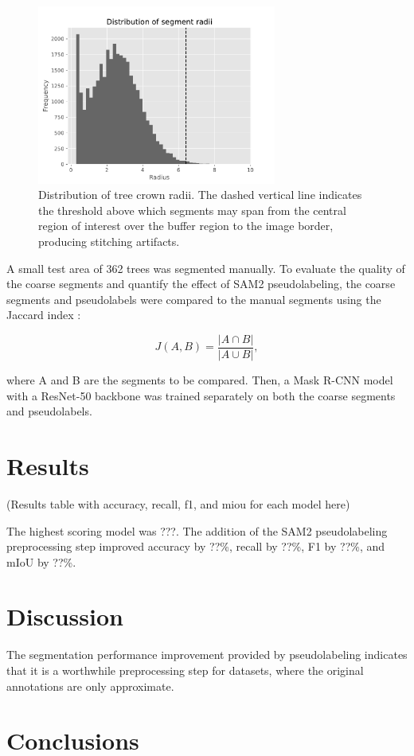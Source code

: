 \documentclass[english, 12pt, a4paper, sci, utf8, a-2b, online]{aaltothesis}
\begin{document}
\begin{figure}[h]
    \centering
    \includegraphics[width=0.7\textwidth]{figures/radii.pdf}
    \caption{Distribution of tree crown radii. The dashed vertical line indicates the threshold above which segments may span from the central region of interest over the buffer region to the image border, producing stitching artifacts.}
    \label{fig:radii}
\end{figure}

A small test area of 362 trees was segmented manually. To evaluate the quality of the coarse segments and quantify the effect of SAM2 pseudolabeling, the coarse segments and pseudolabels were compared to the manual segments using the Jaccard index \cite{jaccard}:

$$
J(A, B) = \frac{|A \cap B|}{|A \cup B |},
$$

where A and B are the segments to be compared. Then, a Mask R-CNN model with a ResNet-50 \cite{resnet} backbone was trained separately on both the coarse segments and pseudolabels.

\section{Results}

(Results table with accuracy, recall, f1, and miou for each model here)

The highest scoring model was ???. The addition of the SAM2 pseudolabeling preprocessing step improved accuracy by ??\%, recall by ??\%, F1 by ??\%, and mIoU by ??\%.

\section{Discussion}

The segmentation performance improvement provided by pseudolabeling indicates that it is a worthwhile preprocessing step for datasets, where the original annotations are only approximate.

\section{Conclusions}

\clearpage

\thesisbibliography


\end{document}
